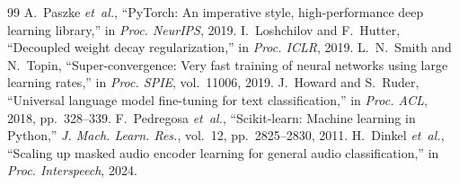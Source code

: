 \documentclass[conference,10pt]{IEEEtran}
\begin{document}
\begin{thebibliography}{99}
 A.~Paszke \emph{et~al.}, ``PyTorch: An imperative style, high-performance deep learning library,'' in \emph{Proc. NeurIPS}, 2019.
 I.~Loshchilov and F.~Hutter, ``Decoupled weight decay regularization,'' in \emph{Proc. ICLR}, 2019.
 L.~N.~Smith and N.~Topin, ``Super-convergence: Very fast training of neural networks using large learning rates,'' in \emph{Proc. SPIE}, vol.~11006, 2019.
 J.~Howard and S.~Ruder, ``Universal language model fine-tuning for text classification,'' in \emph{Proc. ACL}, 2018, pp.~328--339.
 F.~Pedregosa \emph{et~al.}, ``Scikit-learn: Machine learning in Python,'' \emph{J. Mach. Learn. Res.}, vol.~12, pp.~2825--2830, 2011.
 H.~Dinkel \emph{et~al.}, ``Scaling up masked audio encoder learning for general audio classification,'' in \emph{Proc. Interspeech}, 2024.
\end{thebibliography}
\end{document}
